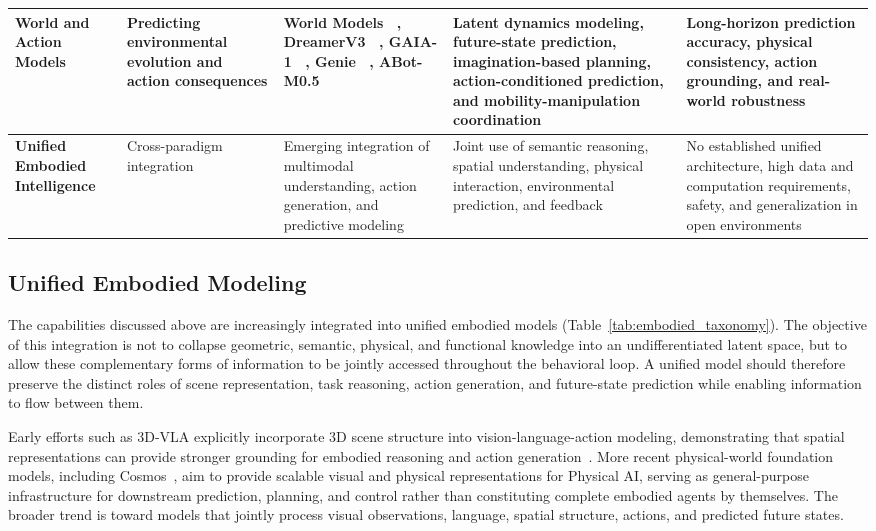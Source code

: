 \documentclass{SCIS2026}
\begin{document}
\begin{table}[!tbp]
\begin{tabularx}{\textwidth}{
>{\centering\arraybackslash}p{2.1cm}
>{\centering\arraybackslash}p{2.2cm}
>{\centering\arraybackslash}p{3.0cm}
>{\centering\arraybackslash}X
>{\centering\arraybackslash}X
}
\textbf{World and Action Models}
&
Predicting environmental evolution and action consequences
&
World Models ~\cite{ha2018world}, 
DreamerV3 ~\cite{hafner2023mastering}, 
GAIA-1 ~\cite{hu2023gaia}, 
Genie ~\cite{bruce2024genie}, 
ABot-M0.5 ~\cite{chen2026abot}
&
Latent dynamics modeling, future-state prediction, imagination-based planning, action-conditioned prediction, and mobility-manipulation coordination
&
Long-horizon prediction accuracy, physical consistency, action grounding, and real-world robustness
\\

\midrule

\textbf{Unified Embodied Intelligence}
&
Cross-paradigm integration
&
Emerging integration of multimodal understanding, action generation, and predictive modeling
&
Joint use of semantic reasoning, spatial understanding, physical interaction, environmental prediction, and feedback
&
No established unified architecture, high data and computation requirements, safety, and generalization in open environments
\\

\bottomrule

\end{tabularx}

\end{table}
\subsection{Unified Embodied Modeling}
The capabilities discussed above are increasingly integrated into unified embodied models (Table~\ref{tab:embodied_taxonomy}). The objective of this integration is not to collapse geometric, semantic, physical, and functional knowledge into an undifferentiated latent space, but to allow these complementary forms of information to be jointly accessed throughout the behavioral loop. A unified model should therefore preserve the distinct roles of scene representation, task reasoning, action generation, and future-state prediction while enabling information to flow between them.

Early efforts such as 3D-VLA explicitly incorporate 3D scene structure into vision-language-action modeling, demonstrating that spatial representations can provide stronger grounding for embodied reasoning and action generation~\cite{zhen20243d}. More recent physical-world foundation models, including Cosmos~\cite{agrawal2025cosmos}, aim to provide scalable visual and physical representations for Physical AI, serving as general-purpose infrastructure for downstream prediction, planning, and control rather than constituting complete embodied agents by themselves. The broader trend is toward models that jointly process visual observations, language, spatial structure, actions, and predicted future states.
\end{document}
